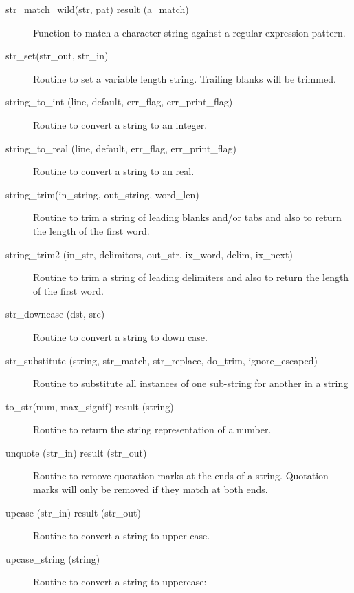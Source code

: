 \begin{description}
\label{r:str.match.wild}
\item[str_match_wild(str, pat) result (a_match)] \Newline 
Function to match a character string against a regular expression pattern.

\label{r:str.set}
\item[str_set(str_out, str_in)] \Newline 
Routine to set a variable length string.
Trailing blanks will be trimmed.

\label{r:string.to.int}
\item[string_to_int (line, default, err_flag, err_print_flag)] \Newline 
Routine to convert a string to an integer.


\label{r:string.to.real}
\item[string_to_real (line, default, err_flag, err_print_flag)] \Newline 
Routine to convert a string to an real.

\label{r:string.trim}
\item[string_trim(in_string, out_string, word_len)] \Newline 
Routine to trim a string of leading blanks and/or tabs and also to return the
length of the first word.

\label{r:string.trim2}
\item[string_trim2 (in_str, delimitors, out_str, ix_word, delim, ix_next)] \Newline 
Routine to trim a string of leading delimiters and also to return the
length of the first word.

\label{r:str.downcase}
\item[str_downcase (dst, src)] \Newline 
Routine to convert a string to down case.

\label{r:str.substitute}
\item[str_substitute (string, str_match, str_replace, do_trim, ignore_escaped)] \Newline 
Routine to substitute all instances of one sub-string for another in a string

\label{r:to.str}
\item[to_str(num, max_signif) result (string)] \Newline 
Routine to return the string representation of a number.

\label{r:unquote}
\item[unquote (str_in) result (str_out)] \Newline 
Routine to remove quotation marks at the ends of a string.
Quotation marks will only be removed if they match at both ends.

\label{r:upcase}
\item[upcase (str_in) result (str_out)] \Newline 
Routine to convert a string to upper case.

\label{r:upcase.string}
\item[upcase_string (string)] \Newline 
Routine to convert a string to uppercase:

\end{description}

